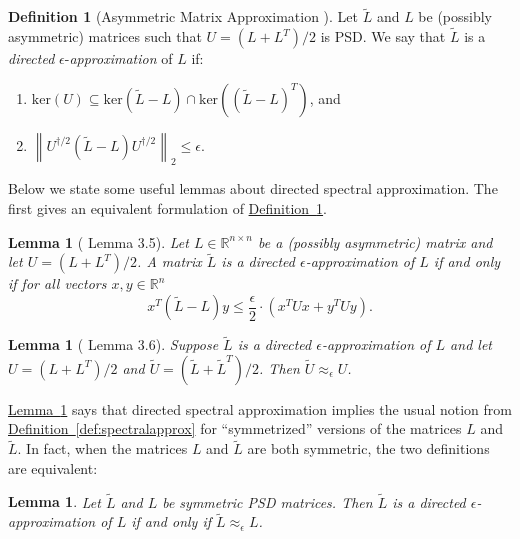 \documentclass[11pt]{article}
\numberwithin{equation}{section}
\newtheorem{lemma}[theorem]{Lemma}
\theoremstyle{definition}
\newtheorem{definition}[theorem]{Definition}
\theoremstyle{plain}
\newcommand{\expref}[2]{\hyperref[#2]{#1~\ref{#2}}}
\newcommand{\wt}{\widetilde}   %
\numberwithin{myalgctr}{section}
\theoremstyle{named}
\begin{document}
\begin{definition}[Asymmetric Matrix Approximation \cite{CKPPRSV16}]
\label{def:dirapprox}
Let $\wt{L}$ and $L$ be (possibly asymmetric) matrices such that $U=(L+L^T)/2$ is PSD. We say that $\wt{L}$ is a \emph{directed} $\epsilon$-\emph{approximation} of $L$ if:
\begin{enumerate}
\item $\mathrm{ker}(U)\subseteq \mathrm{ker}(\wt{L}-L)\cap\mathrm{ker}((\wt{L}-L)^T)$, and
\item $\left\|U^{\dagger/2}(\wt{L}-L)U^{\dagger/2}\right\|_2 \leq \epsilon$.
\end{enumerate}
\end{definition}
Below we state some useful lemmas about directed spectral approximation. The first gives an equivalent formulation of \expref{Definition}{def:dirapprox}.

\begin{lemma}[\cite{CKPPRSV16} Lemma 3.5]
\label{lem:dirapprox}
Let $L\in\mathbb{R}^{n\times n}$ be a (possibly asymmetric) matrix and let $U=(L+L^T)/2$. A matrix $\wt{L}$ is a directed $\epsilon$-approximation of $L$ if and only if for all vectors $x,y\in\mathbb{R}^n$
\[
x^T(\wt{L}-L)y\leq \frac{\epsilon}{2}\cdot(x^TUx + y^TUy).
\]
\end{lemma}

\begin{lemma}[\cite{CKPPRSV16} Lemma 3.6]
\label{lem:dir_implies_undir}
Suppose $\wt{L}$ is a directed $\epsilon$-approximation of $L$ and let $U=(L+L^T)/2$ and $\wt{U}=(\wt{L}+\wt{L}^T)/2$. Then $\wt{U}\approx_{\epsilon}U$.
\end{lemma}

\expref{Lemma}{lem:dir_implies_undir} says that directed spectral approximation implies the usual notion from \expref{Definition}{def:spectralapprox} for ``symmetrized'' versions of the matrices $L$ and $\wt{L}$. In fact, when the matrices $L$ and $\wt{L}$ are both symmetric, the two definitions are equivalent:
\begin{lemma}
\label{lem:symmequiv}
Let $\wt{L}$ and $L$ be symmetric PSD matrices. Then $\wt{L}$ is a directed $\epsilon$-approximation of $L$ if and only if $\wt{L}\approx_{\epsilon}L$.
\end{lemma}
\end{document}
